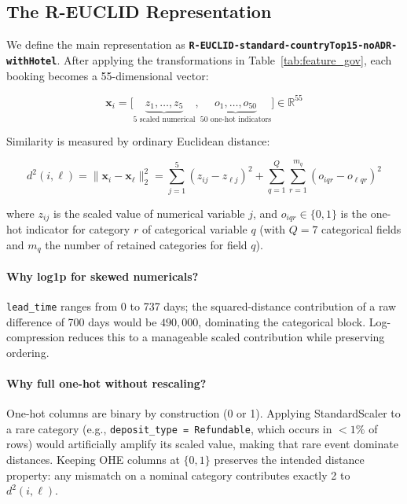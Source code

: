 \documentclass[12pt,a4paper]{article}
\begin{document}
\subsection{The R-EUCLID Representation}
\label{sec:representation}

We define the main representation as
\textbf{\texttt{R-EUCLID-standard-countryTop15-noADR-withHotel}}.
After applying the transformations in Table~\ref{tab:feature_gov}, each
booking becomes a 55-dimensional vector:

\begin{equation}
  \mathbf{x}_i = \bigl[\underbrace{z_1,\ldots,z_5}_{\text{5 scaled numerical}},
                        \underbrace{o_1,\ldots,o_{50}}_{\text{50 one-hot indicators}}\bigr]
  \in \mathbb{R}^{55}
  \label{eq:repr}
\end{equation}

\noindent Similarity is measured by ordinary Euclidean distance:

\begin{equation}
  d^2(i,\ell) = \|\mathbf{x}_i - \mathbf{x}_\ell\|_2^2
              = \sum_{j=1}^{5}(z_{ij}-z_{\ell j})^2
              + \sum_{q=1}^{Q}\sum_{r=1}^{m_q}(o_{iqr}-o_{\ell qr})^2
  \label{eq:euclid}
\end{equation}

\noindent where $z_{ij}$ is the scaled value of numerical variable $j$,
and $o_{iqr}\in\{0,1\}$ is the one-hot indicator for category $r$ of
categorical variable $q$ (with $Q=7$ categorical fields and $m_q$ the
number of retained categories for field $q$).

\paragraph{Why log1p for skewed numericals?}
\texttt{lead\_time} ranges from 0 to 737 days; the squared-distance
contribution of a raw difference of 700 days would be $490{,}000$, dominating the categorical block. Log-compression reduces this
to a manageable scaled contribution while preserving ordering.

\paragraph{Why full one-hot without rescaling?}
One-hot columns are binary by construction (0 or 1). Applying
StandardScaler to a rare category (e.g., \texttt{deposit\_type = Refundable},
which occurs in $< 1\%$ of rows) would artificially amplify its scaled
value, making that rare event dominate distances. Keeping OHE columns at
$\{0,1\}$ preserves the intended distance property: any mismatch on a
nominal category contributes exactly 2 to $d^2(i,\ell)$.
\end{document}
